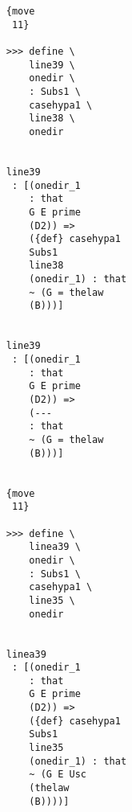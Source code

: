 \documentclass[12pt]{article}
\begin{document}
\begin{verbatim}
                                    {move 
                                     11}

                                    >>> define \
                                        line39 \
                                        onedir \
                                        : Subs1 \
                                        casehypa1 \
                                        line38 \
                                        onedir


                                    line39 
                                     : [(onedir_1 
                                        : that 
                                        G E prime 
                                        (D2)) => 
                                        ({def} casehypa1 
                                        Subs1 
                                        line38 
                                        (onedir_1) : that 
                                        ~ (G = thelaw 
                                        (B)))]


                                    line39 
                                     : [(onedir_1 
                                        : that 
                                        G E prime 
                                        (D2)) => 
                                        (--- 
                                        : that 
                                        ~ (G = thelaw 
                                        (B)))]


                                    {move 
                                     11}

                                    >>> define \
                                        linea39 \
                                        onedir \
                                        : Subs1 \
                                        casehypa1 \
                                        line35 \
                                        onedir


                                    linea39 
                                     : [(onedir_1 
                                        : that 
                                        G E prime 
                                        (D2)) => 
                                        ({def} casehypa1 
                                        Subs1 
                                        line35 
                                        (onedir_1) : that 
                                        ~ (G E Usc 
                                        (thelaw 
                                        (B))))]



\end{verbatim}
\end{document}
